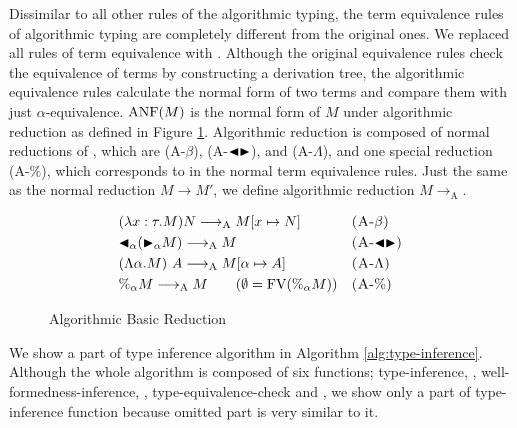 Dissimilar to all other rules of the algorithmic typing, the term equivalence
rules of algorithmic typing are completely different from the original ones. We
replaced all rules of term equivalence with \QAANF. Although the original
equivalence rules check the equivalence of terms by constructing a derivation
tree, the algorithmic equivalence rules calculate the normal form of two terms
and compare them with just \( \alpha \)-equivalence. \( \text{ANF}(M) \) is the
normal form of \( M \) under algorithmic reduction as defined in Figure
\ref{fig:algorithmic-reduction}. Algorithmic reduction is composed of normal
reductions of \LMD, which are \textsc{(A-$\beta$)}, \textsc{(A-${\mathop{\blacktriangleleft}}{\mathop{\blacktriangleright}}$)}, and
\textsc{(A-$\Lambda$)}, and one special reduction \textsc{(A-$\%$)}, which
corresponds to \QPercent in the normal term equivalence rules. Just the same as
the normal reduction \( M \longrightarrow M' \), we define algorithmic
reduction \( M \longrightarrow_{\text{A}} \).  

\begin{center}
\end{center}

\begin{figure}[tbp]
    \begin{center}
        \begin{align*}
            & (\lambda x:\tau.M) N \longrightarrow_{\text{A}} M[x \mapsto N]       &  & \textsc{(A-$\beta$)}   \\
            & {\mathop{\blacktriangleleft}}_\alpha ({\mathop{\blacktriangleright}}_\alpha M) \longrightarrow_{\text{A}} M              &  & \textsc{(A-${\mathop{\blacktriangleleft}}{\mathop{\blacktriangleright}}$)} \\
            & (\Lambda \alpha.M)\ A \longrightarrow_{\text{A}} M[\alpha \mapsto A] &  & \textsc{(A-$\Lambda$)} \\
            & \%_\alpha M \longrightarrow_{\text{A}} M \qquad (\emptyset = \text{FV}(\%_\alpha M)) &  & \textsc{(A-$\%$)}
        \end{align*}
    \end{center}
    \caption{Algorithmic Basic Reduction}
    \label{fig:algorithmic-reduction}
\end{figure}


We show a part of type inference algorithm in Algorithm
\ref{alg:type-inference}. Although the whole algorithm is composed of six
functions; {\sc type-inference}, {}, {\sc
well-formedness-inference}, {}, {\sc
type-equivalence-check} and {}, we show only a part
of {\sc type-inference} function because omitted part is very similar to it.

